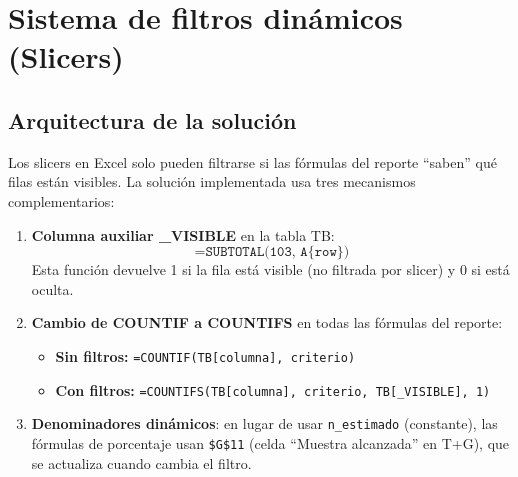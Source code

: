 \documentclass[12pt, letterpaper]{article}
\begin{document}
\begin{center}
\end{center}

\section{Sistema de filtros dinámicos (Slicers)}

\subsection{Arquitectura de la solución}

Los slicers en Excel solo pueden filtrarse si las fórmulas del reporte ``saben'' qué filas están visibles. La solución implementada usa tres mecanismos complementarios:

\begin{enumerate}[leftmargin=1.5cm, label=\textbf{\arabic*.}]
  \item \textbf{Columna auxiliar \_VISIBLE} en la tabla TB:
        \[
          \texttt{=SUBTOTAL(103, A\{row\})}
        \]
        Esta función devuelve 1 si la fila está visible (no filtrada por slicer) y 0 si está oculta.
  \item \textbf{Cambio de COUNTIF a COUNTIFS} en todas las fórmulas del reporte:
        \begin{itemize}
          \item \textbf{Sin filtros:} \texttt{=COUNTIF(TB[columna], criterio)}
          \item \textbf{Con filtros:} \texttt{=COUNTIFS(TB[columna], criterio, TB[\_VISIBLE], 1)}
        \end{itemize}
  \item \textbf{Denominadores dinámicos}: en lugar de usar \texttt{n\_estimado} (constante), las fórmulas de porcentaje usan \texttt{\$G\$11} (celda ``Muestra alcanzada'' en T+G), que se actualiza cuando cambia el filtro.
\end{enumerate}
\end{document}
